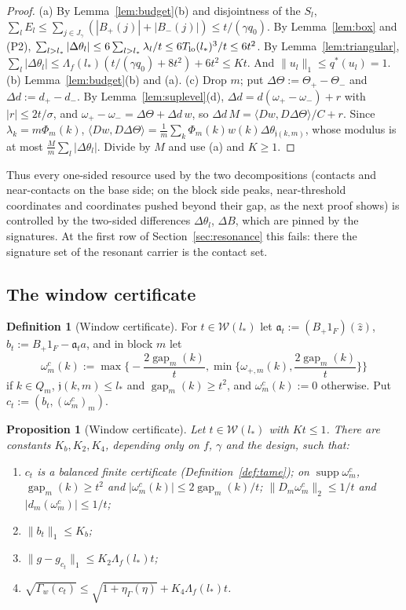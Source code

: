 \documentclass[10pt]{amsart}
\newtheorem{proposition}[theorem]{Proposition}
\theoremstyle{definition}
\newtheorem{definition}[theorem]{Definition}
\theoremstyle{remark}
\newcommand{\supp}{\operatorname{supp}}
\newcommand{\gap}{\operatorname{gap}}
\newcommand{\zh}{\hat z}
\newcommand{\ip}[2]{\langle #1,#2\rangle}
\begin{document}
\begin{proof}
(a) By Lemma~\ref{lem:budget}(b) and disjointness of the $S_l$,
$\sum_lE_l\le\sum_{j\in J_\gamma}(|B_+(j)|+|B_-(j)|)\le t/(\gamma q_0)$.  By
Lemma~\ref{lem:box} and (P2), $\sum_{l>l_*}|\Delta\theta_l|\le6\sum_{l>l_*}
\lambda_l/t\le6T_{\rm lo}(l_*)^3/t\le6t^2$.  By Lemma~\ref{lem:triangular},
$\sum_l|\Delta\theta_l|\le\Lambda_f(l_*)(t/(\gamma q_0)+8t^2)+6t^2\le Kt$.  And
$\|u_l\|_1\le q^*(u_l)=1$.  (b) Lemma~\ref{lem:budget}(b) and (a).
(c) Drop $m$; put $\Delta\Theta:=\Theta_+-\Theta_-$ and $\Delta d:=d_+-d_-$.
By Lemma~\ref{lem:suplevel}(d), $\Delta d=d(\omega_+-\omega_-)+r$ with
$|r|\le2t/\sigma$, and $\omega_+-\omega_-=\Delta\Theta+\Delta d\,w$, so
$\Delta d\,M=\ip{Dw}{D\Delta\Theta}/C+r$.  Since $\lambda_k=m\Phi_m(k)$,
$\ip{Dw}{D\Delta\Theta}=\frac1m\sum_k\Phi_m(k)w(k)\Delta\theta_{\mathfrak j(k,m)}$,
whose modulus is at most $\frac Mm\sum_l|\Delta\theta_l|$.  Divide by $M$ and
use (a) and $K\ge1$.
\end{proof}

Thus every one-sided resource used by the two decompositions (contacts and
near-contacts on the base side; on the block side peaks, near-threshold
coordinates and coordinates pushed beyond their gap, as the next proof
shows) is controlled by the two-sided differences $\Delta\theta_l$, $\Delta B$,
which are pinned by the signatures.  At the first row of
Section~\ref{sec:resonance} this fails: there the signature set of the
resonant carrier is the contact set.

\subsection{The window certificate}

\begin{definition}[Window certificate]\label{def:windowcert}
For $t\in\mathcal W(l_*)$ let $\mathfrak a_t:=(B_+1_F)(\zh)$,
$b_t:=B_+1_F-\mathfrak a_ta$, and in block $m$ let
\[
 \omega^c_m(k):=\max\Big\{-\frac{2\gap_m(k)}t,\min\Big\{\omega_{+,m}(k),
 \frac{2\gap_m(k)}t\Big\}\Big\}
\]
if $k\in Q_m$, $\mathfrak j(k,m)\le l_*$ and $\gap_m(k)\ge t^2$, and
$\omega^c_m(k):=0$ otherwise.  Put $c_t:=(b_t,(\omega^c_m)_m)$.
\end{definition}

\begin{proposition}[Window certificate]\label{prop:windowcert}
Let $t\in\mathcal W(l_*)$ with $Kt\le1$.  There are constants $K_b,K_2,K_4$,
depending only on $f$, $\gamma$ and the design, such that:
\begin{enumerate}
\item[(a)] $c_t$ is a balanced finite certificate (Definition~\ref{def:tame});
on $\supp\omega^c_m$, $\gap_m(k)\ge t^2$ and $|\omega^c_m(k)|\le
2\gap_m(k)/t$; $\|D_m\omega^c_m\|_2\le1/t$ and $|d_m(\omega^c_m)|\le1/t$;
\item[(b)] $\|b_t\|_1\le K_b$;
\item[(c)] $\|g-g_{c_t}\|_1\le K_2\Lambda_f(l_*)t$;
\item[(d)] $\sqrt{\Gamma_w(c_t)}\le\sqrt{1+\eta_\Gamma(\eta)}+K_4\Lambda_f(l_*)t$.
\end{enumerate}
\end{proposition}
\end{document}

